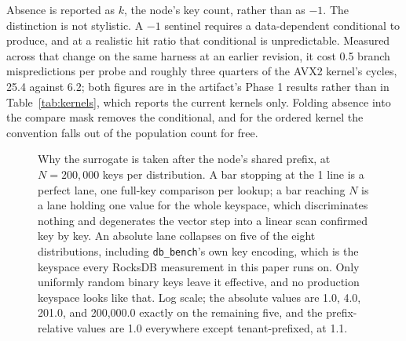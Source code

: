 \documentclass[conference]{IEEEtran}
\begin{document}
Absence is reported as $k$, the node's key count, rather than as $-1$. The
distinction is not stylistic. A $-1$ sentinel requires a data-dependent
conditional to produce, and at a realistic hit ratio that conditional is
unpredictable. Measured across that change on the same harness at an earlier
revision, it cost 0.5 branch mispredictions per probe and roughly three quarters of
the AVX2 kernel's cycles, 25.4 against 6.2; both figures are in the artifact's
Phase 1 results rather than in Table~\ref{tab:kernels}, which reports the current
kernels only. Folding absence into the compare mask
removes the conditional, and for the ordered kernel the convention falls out of the
population count for free.

\begin{figure}[t]
\centering
{}
\caption{Why the surrogate is taken after the node's shared prefix, at $N = 200{,}000$
keys per distribution. A bar stopping at the 1 line is a perfect lane, one full-key
comparison per lookup; a bar reaching $N$ is a lane holding one value for the whole keyspace, which
discriminates nothing and degenerates the vector step into a linear scan confirmed key by
key. An absolute lane collapses on five of the eight distributions, including
\texttt{db\_bench}'s own key encoding, which is the keyspace every RocksDB measurement in
this paper runs on. Only uniformly random binary keys leave it effective, and no
production keyspace looks like that. Log scale; the absolute values are 1.0,
4.0, 201.0, and 200{,}000.0 exactly on the remaining five, and the prefix-relative
values are 1.0 everywhere except tenant-prefixed, at 1.1.}
\label{fig:surrogate}
\end{figure}
\end{document}
